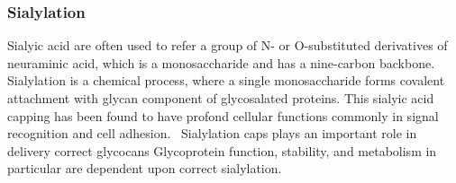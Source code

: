 \subsubsection {Sialylation}
Sialyic acid are often used to refer a group of N- or O-substituted derivatives of neuraminic acid, which is a monosaccharide and has a nine-carbon backbone.~\cite{Vocadlo_2009} Sialylation is a chemical process, where a single monosaccharide forms covalent attachment with glycan component of glycosalated proteins. This sialyic acid capping has been found to have profond cellular functions commonly in signal recognition and cell adhesion.~\cite{Bhide_2016} Sialylation caps plays an important role in delivery correct glycocans Glycoprotein function, stability, and metabolism in particular are dependent upon correct sialylation.
